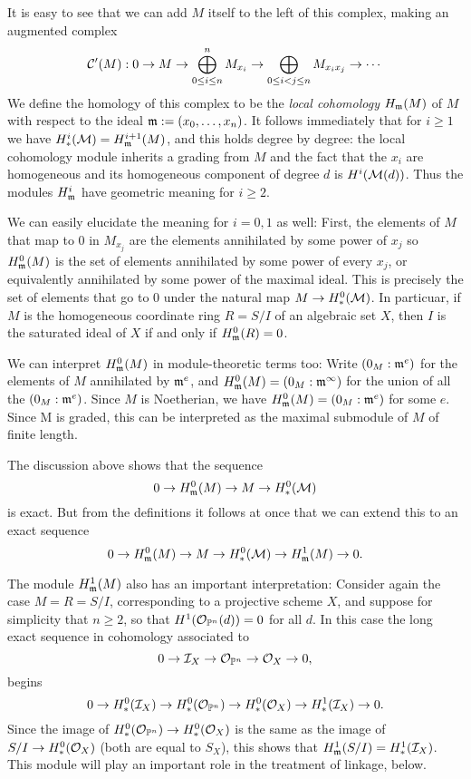 It is easy to see that we can add $M$ itself to the left of this complex, making an augmented complex
$$
\cC'(M): 0\to M \to \bigoplus_{0\leq i \leq n}^{n} M_{x_{i}} \to \bigoplus_{0\leq i<j\leq n} M_{x_{i}x_{j}} \to \cdots
$$
We define the homology of this complex to be the \emph{local cohomology} $H_{\gm}(M)$ of $M$ with respect to the ideal $\gm := (x_{0},\dots,x_{n})$. It follows immediately that for $i\geq 1$ we have
$H^{i}_{*}(\cM) = H^{i+1}_{\gm}(M)$, and this holds degree by degree: the local cohomology module inherits a grading from $M$ and the fact that the $x_{i}$ are homogeneous and its homogeneous component of degree $d$ is
$H^{i}(\cM(d))$. Thus the modules $H_{\gm}^{i}$ have geometric meaning for $i\geq 2$. 

We can easily elucidate the meaning for $i=0,1$ as well: First, the elements of $M$ that map to 0 in $M_{x_{j}}$ are the elements annihilated by some power of $x_{j}$ so $H^{0}_{\gm}(M)$ is the set of elements annihilated by some power of every $x_{j}$, or equivalently annihilated by some power of the maximal ideal. This is precisely the set of elements that go to 0 under the natural map
$M\to H^{0}_{*}(\cM)$.  In particuar, if
$M$ is the homogeneous coordinate ring $R = S/I$ of an algebraic set $X$, then $I$ is the saturated ideal of $X$ if and only if $H^{0}_{\gm}(R) = 0$.

We can interpret $H^{0}_{\gm}(M)$ in module-theoretic terms too: Write 
$(0_{M}:\gm^{e})$ for the elements of $M$ annihilated by $\gm^{e}$, and 
$H^{0}_{\gm}(M) =(0_{M}:\gm^{\infty})$ for the union of all the $(0_{M}:\gm^{e})$. Since $M$ is Noetherian, we have
$H^{0}_{\gm}(M) =(0_{M}:\gm^{e})$ for some $e$.  Since M is graded, this can be interpreted as the maximal submodule of $M$ of finite length. 

The discussion above shows that the sequence
$$
0 \to H^{0}_{\gm} (M) \to M\to H^{0}_{*}(\cM)
$$
is exact. But from the definitions it follows at once that we can extend this to an exact sequence
$$
0 \to H^{0}_{\gm} (M) \to M\to H^{0}_{*}(\cM) \to H^{1}_{\gm} (M) \to 0.
$$

The module $H^{1}_{\gm}(M)$ also has an important interpretation: Consider again the case $M = R = S/I$, corresponding to a projective scheme $X$, and suppose for simplicity that 
$n\geq 2$, so that $H^{1}(\cO_{\PP^{n}}(d)) = 0$ for all $d$. In this case the long exact sequence in cohomology associated to 
$$
0\to \cI_{X} \to \cO_{\PP^{n}} \to \cO_{X}\to 0,
$$
begins
$$
0\to H^{0}_{*}(\cI_{X}) \to H^{0}_{*}(\cO_{\PP^{n}}) \to H^{0}_{*}(\cO_{X})\to H^{1}_{*}(\cI_{X}) \to 0.
$$
Since the image of $H^{0}_{*}(\cO_{\PP^{n}}) \to H^{0}_{*}(\cO_{X})$ is  the same as
the image of $S/I \to H^{0}_{*}(\cO_{X})$ (both are equal to $S_{X}$), 
this shows that $H^{1}_{\gm}(S/I) = H^{1}_{*}(\cI_{X})$. This module will play an important role in the treatment of linkage, below.

